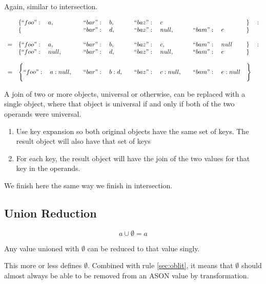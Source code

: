 \documentclass[letterpaper]{article}
\begin{document}
Again, similar to intersection.

\begin{prule}
\begin{equation}
\begin{array}{rlllll}
& \{``foo":\quad a,\quad&``bar":\quad b,\quad&``baz":\quad c&&\}\quad:\\
& \{&``bar":\quad d,\quad&``baz":\quad null,\quad&``bam":\quad e&\} \\
\\
=&\{``foo":\quad a,\quad&``bar":\quad b,\quad&``baz":\quad c,\quad&``bam":\quad null&\}\quad:\\
 &\{``foo":\quad null,\quad&``bar":\quad d,\quad&``baz":\quad null,\quad&``bam":\quad e&\} \\
\\
=&\Bigg\{``foo":\quad a: null,\quad&``bar":\quad b:
d,\quad&``baz":\quad c: null,\quad&``bam":\quad e: null&\Bigg\}\\
\end{array}
\end{equation}

A join of two or more objects, universal or otherwise, can be replaced
with a single object, where that object is universal if and only if both of
the two operands were universal.
\begin{enumerate}
\item Use key expansion so both original objects have the same set of keys. The
result object will also have that set of keys
\item For each key, the result object will have the join of the two
values for that key in the operands.
\end{enumerate}
\end{prule}

We finish here the same way we finish in intersection.

\subsection{Union Reduction}
\begin{prule}
\begin{equation}
a\cup\emptyset = a
\end{equation}

Any value unioned with \(\emptyset\) can be reduced to that value singly.
\end{prule}

This more or less defines \(\emptyset\). Combined with rule \ref{sec:oblit}, it means
that \(\emptyset\) should almost always be able to be removed from an ASON
value by transformation.
\end{document}
